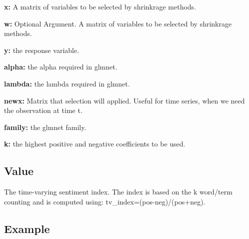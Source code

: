 \documentclass[]{article}
\begin{document}
\textbf{x:} A matrix of variables to be selected by shrinkrage methods.

\textbf{w:} Optional Argument. A matrix of variables to be selected by
shrinkrage methods.

\textbf{y:} the response variable.

\textbf{alpha:} the alpha required in glmnet.

\textbf{lambda:} the lambda required in glmnet.

\textbf{newx:} Matrix that selection will applied. Useful for time
series, when we need the observation at time t.

\textbf{family:} the glmnet family.

\textbf{k:} the highest positive and negative coefficients to be used.

\subsection{Value}\label{value-11}

The time-varying sentiment index. The index is based on the k word/term
counting and is computed using: tv\_index=(pos-neg)/(pos+neg).

\subsection{Example}\label{example-11}
\end{document}
